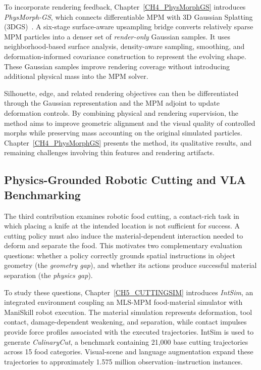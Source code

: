     To incorporate rendering feedback, Chapter~\ref{CH4_PhysMorphGS} introduces \emph{PhysMorph-GS}, which connects differentiable MPM with 3D Gaussian Splatting (3DGS)~\citep{kerbl20233d}. A six-stage surface-aware upsampling bridge converts relatively sparse MPM particles into a denser set of \emph{render-only} Gaussian samples. It uses neighborhood-based surface analysis, density-aware sampling, smoothing, and deformation-informed covariance construction to represent the evolving shape. These Gaussian samples improve rendering coverage without introducing additional physical mass into the MPM solver.
    
    Silhouette, edge, and related rendering objectives can then be differentiated through the Gaussian representation and the MPM adjoint to update deformation controls. By combining physical and rendering supervision, the method aims to improve geometric alignment and the visual quality of controlled morphs while preserving mass accounting on the original simulated particles. Chapter~\ref{CH4_PhysMorphGS} presents the method, its qualitative results, and remaining challenges involving thin features and rendering artifacts.

\subsection{Physics-Grounded Robotic Cutting and VLA Benchmarking}
\label{sec:contrib_cutting}
    The third contribution examines robotic food cutting, a contact-rich task in which placing a knife at the intended location is not sufficient for success. A cutting policy must also induce the material-dependent interaction needed to deform and separate the food. This motivates two complementary evaluation questions: whether a policy correctly grounds spatial instructions in object geometry (the \emph{geometry gap}), and whether its actions produce successful material separation (the \emph{physics gap}).
    
    To study these questions, Chapter~\ref{CH5_CUTTINGSIM} introduces \emph{IntSim}, an integrated environment coupling an MLS-MPM food-material simulator with ManiSkill robot execution. The material simulation represents deformation, tool contact, damage-dependent weakening, and separation, while contact impulses provide force profiles associated with the executed trajectories. IntSim is used to generate \emph{CulinaryCut}, a benchmark containing 21,000 base cutting trajectories across 15 food categories. Visual-scene and language augmentation expand these trajectories to approximately 1.575 million observation--instruction instances.
    
